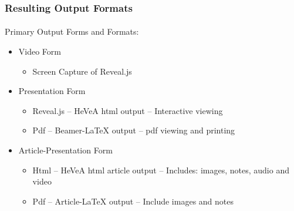 \begin{whenOrg}
\begin{verblatex}

\begin{frame}[fragile,plain,label=resultingOutputs]
    \frametitle{Resulting Output Formats}
    \framesubtitle{}

    Primary Output Forms and Formats:

    \bigskip

    \begin{itemize}
    \item  Video Form
        \begin{itemize}
          \item Screen Capture of Reveal.js
        \end{itemize}
    \item  Presentation Form
        \begin{itemize}
          \item Reveal.js  -- HeVeA html output -- Interactive viewing
          \item Pdf  -- Beamer-LaTeX output -- pdf viewing and printing
        \end{itemize}
    \item  Article-Presentation Form
        \begin{itemize}
          \item Html  -- HeVeA html article output -- Includes: images, notes, audio and video
          \item Pdf  -- Article-LaTeX output -- Include images and notes
        \end{itemize}
    \end{itemize}




\end{frame}
\end{verblatex}




\end{whenOrg}
